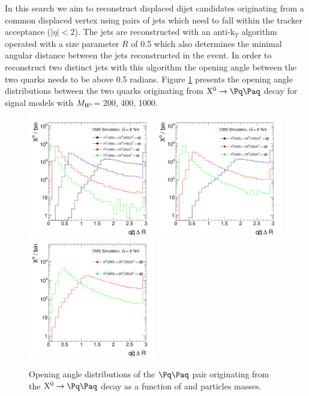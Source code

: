 In this search we aim to reconstruct displaced dijet candidates originating from a common displaced
vertex using pairs of 
 jets which need to fall 
within the tracker acceptance ($|\eta|<2$).  
 The jets are reconstructed with an anti-k$_T$
algorithm operated with a size parameter $R$ of 0.5 \cite{Cacciari:2008gp} which also determines
the minimal angular distance between the jets reconstructed in the event. 
In order to reconstruct two distinct
jets with this algorithm the opening angle between the two quarks needs to be above 0.5 radians.
Figure \ref{fig:sigdR} presents the opening angle distributions between the two quarks originating
from $\X \to \qq $ decay for signal models with 
$M_{\mathrm{H}^{0}}$= 200, 400, 1000\GeV.  

\begin{figure}[htbp]
\centering
\includegraphics[width=0.49\textwidth]{plots/signal/dRH1000.pdf}
\includegraphics[width=0.49\textwidth]{plots/signal/dRH400.pdf}
\includegraphics[width=0.49\textwidth]{plots/signal/dRH200.pdf}
\caption{Opening angle distributions of the $\qq$ pair originating from the $\X \to \qq$ decay as a function
of \Higgs and \X particles masses. \label{fig:sigdR}}
\end{figure}

